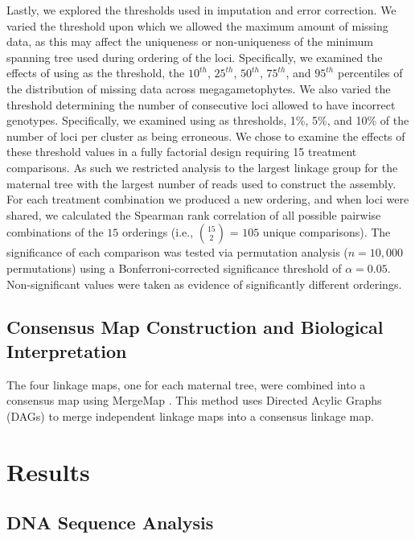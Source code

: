 \documentclass[11pt]{article}
\begin{document}
Lastly, we explored the thresholds used in imputation and error correction. We varied the threshold upon which 
we allowed the maximum amount of missing data, as this may affect the uniqueness 
or non-uniqueness of the minimum spanning tree used during ordering of the loci. Specifically, 
we examined the effects of using as the threshold, the $10^{th}$, $25^{th}$, $50^{th}$, $75^{th}$, and $95^{th}$ percentiles of 
the distribution of missing data across megagametophytes. We also varied the threshold determining 
the number of consecutive loci allowed to have incorrect genotypes. Specifically, we 
examined using as thresholds, 1\%, 5\%, and 10\% of the number of loci per cluster as being erroneous. We chose to 
examine the effects of these threshold values in a fully factorial design requiring 15 treatment comparisons. As such we restricted 
analysis to the largest linkage group for the maternal tree with the largest number of reads used to construct 
the assembly. For each treatment combination we produced a new ordering, and when loci were shared, we calculated 
the Spearman rank correlation of all possible pairwise combinations of the $15$ orderings (i.e., {$15 \choose 2$} = $105$ unique 
comparisons). The significance of each comparison was tested via permutation analysis ($n = 10,000$ permutations) 
using a Bonferroni-corrected significance threshold of $\alpha = 0.05$. Non-significant values were taken as evidence of significantly 
different orderings.

\subsection*{Consensus Map Construction and Biological Interpretation}\label{ss:consensus}
The four linkage maps, one for each maternal tree, were combined into a consensus map using MergeMap \citep{Wu:2008b}. This 
method uses Directed Acylic Graphs (DAGs) to merge independent linkage maps into a consensus linkage map.

\section*{Results}

\subsection*{DNA Sequence Analysis}
\end{document}
